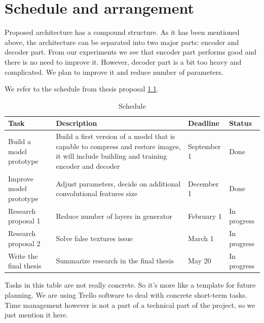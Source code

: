 \chapter{Schedule and arrangement}

Proposed architecture has a compound structure. As it has been mentioned above, the architecture can be separated into two major parts: encoder and decoder part. From our experiments we see that encoder part performs good and there is no need to improve it. However, decoder part is a bit too heavy and complicated. We plan to improve it and reduce number of parameters.

We refer to the schedule from thesis proposal \ref{tab:schedule}.

\begin{table}
    \centering
    \caption{Schedule}
    \label{tab:schedule}
    \begin{tabular}{p{4cm}|p{8cm}|p{2cm}|p{2cm}}
        \hline
        Task                    & Description                                                                                                                                & Deadline    & Status      \\
        \hline
        Build a model prototype & Build a first version of a model that is capable to compress and restore images, it will include building and training encoder and decoder & September 1 & Done        \\
        \hline
        Improve model prototype & Adjust parameters, decide on additional convolutional features size                                                                        & December 1  & Done        \\
        \hline
        Research proposal 1     & Reduce number of layers in generator                                                                                                       & February 1  & In progress \\
        \hline
        Research proposal 2     & Solve false textures issue                                                                                                                 & March 1     & In progress \\
        \hline
        Write the final thesis  & Summarize research in the final thesis                                                                                                     & May 20      & In progress \\
        \hline
    \end{tabular}
\end{table}

Tasks in this table are not really concrete. So it's more like a template for future planning. We are using Trello software to deal with concrete short-term tasks. Time management however is not a part of a technical part of the project, so we just mention it here.